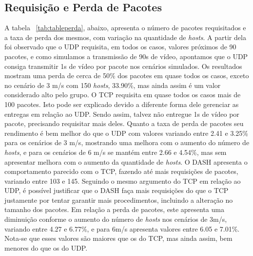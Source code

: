 \documentclass[12pt]{article}
\begin{document}
\subsection{Requisição e Perda de Pacotes} \label{sec:perda}
    A tabela ~\ref{tab:tableperda}, abaixo, apresenta o número de pacotes requisitados e a taxa de perda dos mesmos, com variação na quantidade de \textit{hosts}. A partir dela foi observado que o UDP requisita, em todos os casos, valores próximos de 90 pacotes, e como simulamos a transmissão de 90s de vídeo, apontamos que o UDP consiga transmitir 1s de vídeo por pacote nos cenários simulados. Os resultados mostram uma perda de cerca de 50\% dos pacotes em quase todos os casos, exceto no cenário de 3 m/s com 150 \textit{hosts}, 33.90\%, mas ainda assim é um valor considerado alto pelo grupo. O TCP requisita em quase todos os casos mais de 100 pacotes. Isto pode ser explicado devido a diferente forma dele gerenciar as entregas em relação ao UDP. Sendo assim, talvez não entregue 1s de vídeo por pacote, precisando requisitar mais deles. Quanto a taxa de perda de pacotes seu rendimento é bem melhor do que o UDP com valores variando entre 2.41 e 3.25\% para os cenários de 3 m/s, mostrando uma melhora com o aumento do número de \textit{hosts}, e para os cenários de 6 m/s se mantém entre 2.66 e 4.54\%, mas sem apresentar melhora com o aumento da quantidade de \textit{hosts}. O DASH apresenta o comportamento parecido com o TCP, fazendo até mais requisições de pacotes, variando entre 103 e 145. Seguindo o mesmo argumento do TCP em relação ao UDP, é possível justificar que o DASH faça mais requisições do que o TCP justamente por tentar garantir mais procedimentos, incluindo a alteração no tamanho dos pacotes. Em relação a perda de pacotes, este apresenta uma diminuição conforme o aumento do número de \textit{hosts} nos cenários de 3m/s, variando entre 4.27 e 6.77\%, e para 6m/s apresenta valores entre 6.05 e 7.01\%. Nota-se que esses valores são maiores que os do TCP, mas ainda assim, bem menores do que os do UDP.
    
\end{document}
